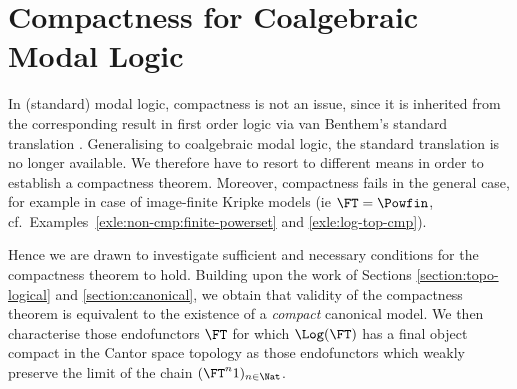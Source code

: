 \documentclass{entcs}
\begin{document}
\section{Compactness for Coalgebraic Modal Logic}\label{section:compactness}

In (standard) modal logic, compactness is not an issue, since it is inherited
from the corresponding result in first order logic via van Benthem's standard
translation \cite{benthem:mlcl,brv}.  Generalising to coalgebraic modal logic,
the standard translation is no longer available. We therefore have to resort
to different means in order to establish a compactness theorem. 
Moreover, compactness fails in the general case, for example in case of
image-finite Kripke models (ie $\FT=\Powfin$, cf.\ 
Examples~\ref{exle:non-cmp:finite-powerset} and \ref{exle:log-top-cmp}).

Hence we are drawn to investigate sufficient and necessary conditions for the
compactness theorem to hold. Building upon the work of Sections
\ref{section:topo-logical} and \ref{section:canonical}, we obtain that
validity of the compactness theorem is equivalent to the existence of a
\emph{compact} canonical model. We then characterise those endofunctors $\FT$
for which $\Log(\FT)$ has a final object compact in the Cantor space topology
as those endofunctors which weakly preserve the limit of the chain $(\FT^n
1)_{n \in \Nat}$.

\end{document}
